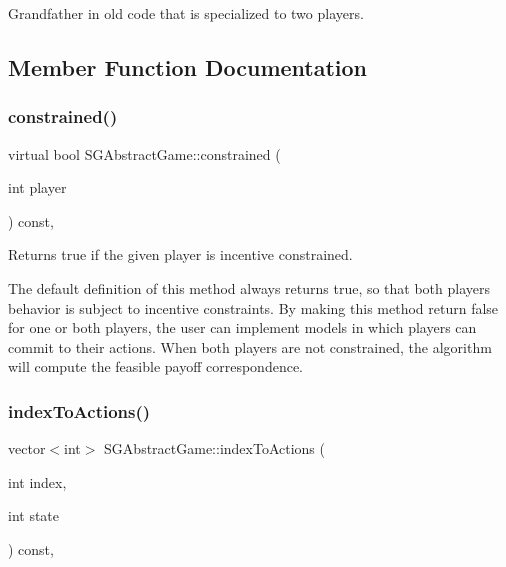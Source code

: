 Grandfather in old code that is specialized to two players. 

\subsection{Member Function Documentation}
\mbox{\label{classSGAbstractGame_abd2542c0b2db7ed40d307f7f0a53048b}} 
\subsubsection{\texorpdfstring{constrained()}{constrained()}}
{\footnotesize\ttfamily virtual bool S\+G\+Abstract\+Game\+::constrained (\begin{DoxyParamCaption}\item[{int}]{player }\end{DoxyParamCaption}) const\hspace{0.3cm}{\ttfamily [inline]}, {\ttfamily [virtual]}}



Returns true if the given player is incentive constrained. 

The default definition of this method always returns true, so that both players\textquotesingle{} behavior is subject to incentive constraints. By making this method return false for one or both players, the user can implement models in which players can commit to their actions. When both players are not constrained, the algorithm will compute the feasible payoff correspondence. \mbox{\label{classSGAbstractGame_a1b1ab8f6b09aaef481ba8eab5934ac66}} 
\subsubsection{\texorpdfstring{index\+To\+Actions()}{indexToActions()}}
{\footnotesize\ttfamily vector$<$int$>$ S\+G\+Abstract\+Game\+::index\+To\+Actions (\begin{DoxyParamCaption}\item[{int}]{index,  }\item[{int}]{state }\end{DoxyParamCaption}) const\hspace{0.3cm}{\ttfamily [inline]}, {\ttfamily [protected]}}



